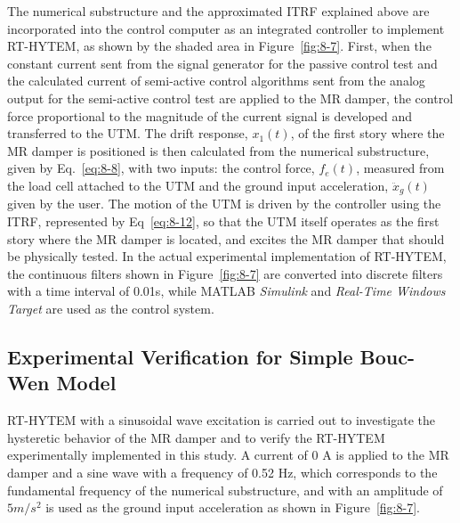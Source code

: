 The numerical substructure and the approximated ITRF explained above are incorporated into the control computer as an integrated controller to implement RT-HYTEM, as shown by the shaded area in Figure~\ref{fig:8-7}. First, when the constant current sent from the signal generator for the passive control test and the calculated current of semi-active control algorithms sent from the analog output for the semi-active control test are applied to the MR damper, the control force proportional to the magnitude of the current signal is developed and transferred to the UTM. The drift response, $x_{1}(t)$, of the first story where the MR damper is positioned is then calculated from the numerical substructure, given by Eq.~\eqref{eq:8-8}, with two inputs: the control force, $f_{e}(t)$, measured from the load cell attached to the UTM and the ground input acceleration, $\ddot{x}_{g}(t)$ given by the user. The motion of the UTM is driven by the controller using the ITRF, represented by Eq~\eqref{eq:8-12}, so that the UTM itself operates as the first story where the MR damper is located, and excites the MR damper that should be physically tested. In the actual experimental implementation of RT-HYTEM, the continuous filters shown in Figure~\ref{fig:8-7} are converted into discrete filters with a time interval of 0.01s, while MATLAB \textit{Simulink}\citep{simulink2009version} and \textit{Real-Time Windows Target}\citep{targetuser} are used as the control system.

\subsection{Experimental Verification for Simple Bouc-Wen Model}

RT-HYTEM with a sinusoidal wave excitation is carried out to investigate the hysteretic behavior of the MR damper and to verify the RT-HYTEM experimentally implemented in this study. A current of 0 A is applied to the MR damper and a sine wave with a frequency of 0.52 Hz, which corresponds to the fundamental frequency of the numerical substructure, and with an amplitude of $5m/s^{2}$ is used as the ground input acceleration as shown in Figure~\ref{fig:8-7}.

